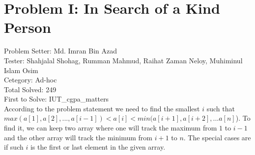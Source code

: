 \section*{Problem I: In Search of a Kind Person}
Problem Setter: Md. Imran Bin Azad \\
Tester: Shahjalal Shohag, Rumman Mahmud, Raihat Zaman Neloy, Muhiminul Islam Osim \\
Cetegory: Ad-hoc \\
Total Solved: 249 \\
First to Solve: IUT\_cgpa\_matters\\

According to the problem statement we need to find the smallest $i$ such that
$max(a[1], a[2], ... , a[i-1]) < a[i] < min(a[i+1], a[i+2], ... a[n]$). To find
it, we can keep two array where one will track the maximum from $1$ to $i-1$
and the other array will track the minimum from $i+1$ to $n$. The special cases
are if such $i$ is the first or last element in the given array.